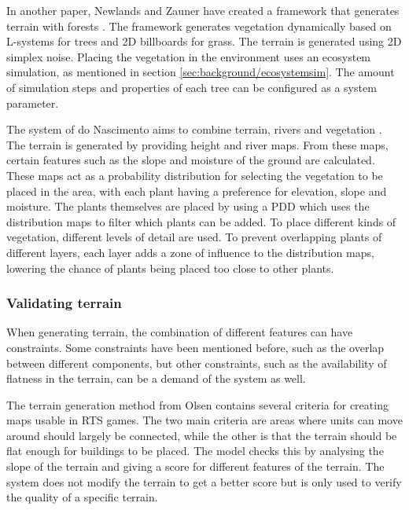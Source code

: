 \documentclass{article}
\begin{document}
In another paper, Newlands and Zauner have created a framework that generates terrain with forests \cite{newlands_procedural_2022}. The framework generates vegetation dynamically based on L-systems for trees and 2D billboards for grass. The terrain is generated using 2D simplex noise. Placing the vegetation in the environment uses an ecosystem simulation, as mentioned in section \ref{sec:background/ecosystemsim}. The amount of simulation steps and properties of each tree can be configured as a system parameter.

The system of do Nascimento aims to combine terrain, rivers and vegetation \cite{do_nascimento_gpu-based_2018}. The terrain is generated by providing height and river maps. From these maps, certain features such as the slope and moisture of the ground are calculated. These maps act as a probability distribution for selecting the vegetation to be placed in the area, with each plant having a preference for elevation, slope and moisture. The plants themselves are placed by using a PDD which uses the distribution maps to filter which plants can be added. To place different kinds of vegetation, different levels of detail are used. To prevent overlapping plants of different layers, each layer adds a zone of influence to the distribution maps, lowering the chance of plants being placed too close to other plants.

\subsubsection{Validating terrain}
When generating terrain, the combination of different features can have constraints. Some constraints have been mentioned before, such as the overlap between different components, but other constraints, such as the availability of flatness in the terrain, can be a demand of the system as well.

The terrain generation method from Olsen \cite{olsen_realtime_2004} contains several criteria for creating maps usable in RTS games. The two main criteria are areas where units can move around should largely be connected, while the other is that the terrain should be flat enough for buildings to be placed. The model checks this by analysing the slope of the terrain and giving a score for different features of the terrain. The system does not modify the terrain to get a better score but is only used to verify the quality of a specific terrain.
\end{document}
